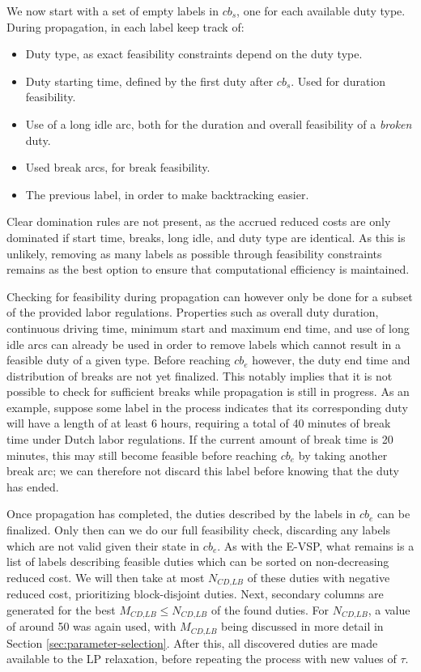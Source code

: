 \documentclass[]{article}
\begin{document}
We now start with a set of empty labels in $cb_s$, one for each available duty type. During propagation, in each label keep track of:
\begin{itemize}
  \item Duty type, as exact feasibility constraints depend on the duty type.
  \item Duty starting time, defined by the first duty after $cb_s$. Used for duration feasibility.
  \item Use of a long idle arc, both for the duration and overall feasibility of a \textit{broken} duty.
  \item Used break arcs, for break feasibility. 
  \item The previous label, in order to make backtracking easier. 
\end{itemize}
Clear domination rules are not present, as the accrued reduced costs are only dominated if start time, breaks, long idle, and duty type are identical. As this is unlikely, removing as many labels as possible through feasibility constraints remains as the best option to ensure that computational efficiency is maintained.

Checking for feasibility during propagation can however only be done for a subset of the provided labor regulations. Properties such as overall duty duration, continuous driving time, minimum start and maximum end time, and use of long idle arcs can already be used in order to remove labels which cannot result in a feasible duty of a given type. Before reaching $cb_e$ however, the duty end time and distribution of breaks are not yet finalized. This notably implies that it is not possible to check for sufficient breaks while propagation is still in progress. As an example, suppose some label in the process indicates that its corresponding duty will have a length of at least 6 hours, requiring a total of 40 minutes of break time under Dutch labor regulations. If the current amount of break time is 20 minutes, this may still become feasible before reaching $cb_e$ by taking another break arc; we can therefore not discard this label before knowing that the duty has ended.  

Once propagation has completed, the duties described by the labels in $cb_e$ can be finalized. Only then can we do our full feasibility check, discarding any labels which are not valid given their state in $cb_e$. As with the E-VSP, what remains is a list of labels describing feasible duties which can be sorted on non-decreasing reduced cost. We will then take at most $N_{\textit{CD,LB}}$ of these duties with negative reduced cost, prioritizing block-disjoint duties. Next, secondary columns are generated for the best $M_{\textit{CD,LB}} \leq N_{\textit{CD,LB}}$ of the found duties. For $N_{\textit{CD,LB}}$, a value of around 50 was again used, with $M_{\textit{CD,LB}}$ being discussed in more detail in Section \ref{sec:parameter-selection}. After this, all discovered duties are made available to the LP relaxation, before repeating the process with new values of $\tau$. 
\end{document}
